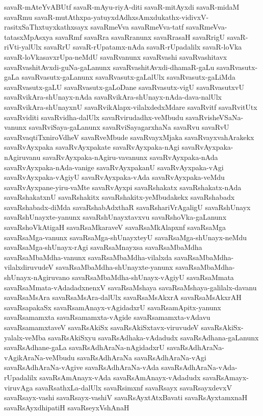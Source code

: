 {savaR-mAteYvABUtf
savaR-mAyu-riyA-diti
savaR-mitAyxdi
savaR-midaM
savaRmu
savaR-mutAthxpa-yatuyxdAdhxsAmxdukathx-vidivxV-rasitxSaThxtuyxkathxsayx
savaRmeVva
savaRmeVva-tatf
savaRmeVva-tatasxMpAsxya
savaRmf
savaRra
savaRranunx
savaRrasaH
savaRrigU
savaR-riVti-yalUlx
savaRrU
savaR-rUpatamx-nAda
savaR-rUpadalilx
savaR-loVka
savaR-loVkasavxrUpa-neMdU
savaRvanunx
savaRvashi
savaRvashitavx
savaRvashitAvxdi-guNa-gaLanunx
savaRvashitAvxdi-dhamaR-gaLu
savaRvasutx-gaLa
savaRvasutx-gaLanunx
savaRvasutx-gaLalUlx
savaRvasutx-gaLiMda
savaRvasutx-gaLU
savaRvasutx-gaLoDane
savaRvasutx-vigU
savaRvasutxvU
savaRvikAra-shUnayx-nAda
savaRvikAra-shUnayx-nAda-dava-nalUlx
savaRvikAra-shUnayxnU
savaRvikAlapx-vilalxdedxMdare
savaRvitf
savaRvitUtx
savaRviditi
savaRvidha-dalUlx
savaRvirudadhx-veMbudu
savaRvisheVSaNa-vanunx
savaRviSaya-gaLanunx
savaRviSayagarxhaNa
savaRvu
savaRvU
savaRvaqtiTxniroVdheV
savaRveMbude
savaRvayxMjaka
savaRvayxvahArakekx
savaRvAyxpaka
savaRvAyxpakate
savaRvAyxpaka-nAgi
savaRvAyxpaka-nAgiruvanu
savaRvAyxpaka-nAgiru-vavanunx
savaRvAyxpaka-nAda
savaRvAyxpaka-nAda-vanige
savaRvAyxpakanU
savaRvAyxpaka-vAgi
savaRvAyxpaka-vAgiyU
savaRvAyxpaka-vAda
savaRvAyxpaka-veMdu
savaRvAyxpane-yiru-vaMte
savaRvAyxpi
savaRshakatx
savaRshakatx-nAda
savaRshakatxnU
savaRshakitx
savaRshakitx-yeMbudakekx
savaRshabadx
savaRshabadx-diMda
savaRshabAdxthaR
savaRshariVrAgaligU
savaRshUnayx
savaRshUnayxte-yanunx
savaRshUnayxtavxvu
savaRshoVka-gaLanunx
savaRshoVkAtigaH
savaRsaMkaraveV
savaRsaMkAlapxnf
savaRsaMga
savaRsaMga-vanunx
savaRsaMga-shUnayxteyU
savaRsaMga-shUnayx-neMdu
savaRsaMga-shUnayx-rAgi
savaRsaMnayxsa
savaRsaMbaMdha
savaRsaMbaMdha-vanunx
savaRsaMbaMdha-vilalxda
savaRsaMbaMdha-vilalxdiruvudeV
savaRsaMbaMdha-shUnayxte-yanunx
savaRsaMbaMdha-shUnayx-nAgiruvano
savaRsaMbaMdha-shUnayx-vAgiyU
savaRsaMmata
savaRsaMmata-vAdadadxnenxV
savaRsaMshaya
savaRsaMshaya-galilalx-davanu
savaRsaMsAra
savaRsaMsAra-dalUlx
savaRsaMsAkxrA
savaRsaMsAkxrAH
savaRsapakaSx
savaRsamAnayx-vAgidadxrU
savaRsamApitx-yanunx
savaRsamamxta
savaRsamamxta-vAgide
savaRsamamxta-vAdavu
savaRsamamxtaveV
savaRsAkiSx
savaRsAkiSxtavx-viruvudeV
savaRsAkiSx-yalalx-veMba
savaRsAkiSxyu
savaRsAdhaka-vAdadudx
savaRsAdhana-gaLanunx
savaRsAdhane-gaLa
savaRsAdhAraNa-nAgidadxrU
savaRsAdhAraNa-vAgikAraNa-veMbudu
savaRsAdhAraNa
savaRsAdhAraNa-vAgi
savaRsAdhAraNa-vAgive
savaRsAdhAraNa-vAda
savaRsAdhAraNa-vAda-rUpadalilx
savaRsAmAnayx-vAda
savaRsAmAnayx-vAdadudx
savaRsAmayx-viruvAga
savaRsathxLa-dalUlx
savaRsimxnf
savaRsayx
savaRsayxdevxV
savaRsayx-vashi
savaRsayx-vashiV
savaRsAyxtAtxBavati
savaRsAyxtamxnaH
savaRsAyxdhipatiH
savaRseyxVshAnaH
}
